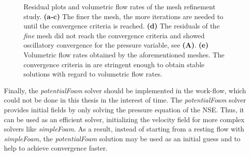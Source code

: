 \begin{figure}[!h]
{\begin{annotatedFigure}
	\end{annotatedFigure}}\hfil
	\centering
	\captionsetup{format=plain}%
	\caption[Residual plots and volumetric flow rates of the mesh refinement study]{Residual plots and volumetric flow rates of the mesh refinement study. \textbf{(a-c)} The finer the mesh, the more iterations are needed to until the convergence criteria is reached. \textbf{(d)} The residuals of the \textit{fine} mesh did not reach the convergence criteria and showed oscillatory convergence for the pressure variable, see \textbf{(A)}. \textbf{(e)} Volumetric flow rates obtained by the aforementioned meshes. The convergence criteria in  are stringent enough to obtain stable solutions with regard to volumetric flow rates.}
	\label{fig:validation:residual_plots+volumetric_flow rates}
\end{figure}




Finally, the \textit{potentialFoam} solver should be implemented in the work-flow, which could not be done in this thesis in the interest of time.
The \textit{potentialFoam} solver provides initial fields by only solving the pressure equation of the \gls{NSE}.
Thus, it can be used as an efficient solver, initializing the velocity field for more complex solvers like \textit{simpleFoam}. 
As a result, instead of starting from a resting flow with \textit{simpleFoam}, the \textit{potentialFoam} solution may be used as an initial guess and to help to achieve convergence faster.



\FloatBarrier

